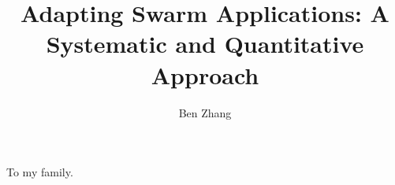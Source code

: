 \documentclass[phd]{ucbthesis}
\begin{document}
\title{Adapting Swarm Applications: A Systematic and Quantitative Approach}
\author{Ben Zhang}

\maketitle

{ \dsp\copyrightpage }



\begin{frontmatter}
  \begin{dedication}
    \null\vfil
    \begin{center}
      \vspace*{\fill}
      To my family.
      \vspace*{\fill}
    \end{center}
    \vfil\null
  \end{dedication}

  \tableofcontents
  \clearpage
  \listoffigures
  \clearpage
  \listoftables

  
\end{frontmatter}

\pagestyle{headings}








\printbibliography

\begin{appendices}
  
\end{appendices}
\end{document}
